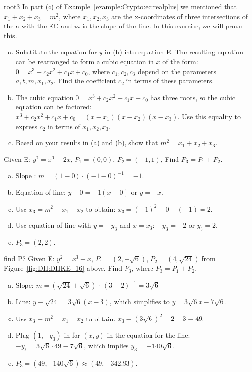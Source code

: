 \begin{exercise}{root3}
In part (c) of Example~\ref{example:Crypto:ec:realplus} we mentioned that $x_1+x_2+x_3=m^2$, where $x_1,x_2,x_3$ are the x-coordinates of three intersections of the a with the EC and $m$ is the slope of the line.  In this exercise, we will prove this.
\begin{enumerate}[(a)]
\item
Substitute the equation for $y$ in (b) into equation E. The resulting equation can be rearranged to form a cubic equation in $x$ of the form: $0 = x^3 + c_2 x^2 + c_1 x + c_0$, where $c_1, c_2, c_3$ depend on the parameters $a,b,m,x_1,x_2$. Find the coefficient $c_2$ in terms of these parameters.
\item
The cubic equation $0 = x^3 + c_2 x^2 + c_1 x + c_0$ has three roots, so the cubic equation can be factored:  $x^3 + c_2 x^2 + c_1 x + c_0 = (x-x_1)(x-x_2)(x-x_3)$. Use this equality to express $c_2$ in terms of $x_1, x_2, x_3$.
\item
Based on your results in (a) and (b), show that $m^2 = x_1 + x_2 + x_3$.
\end{enumerate}
\end{exercise}

\begin{example}{} 
Given E: $y^2 = x^3 - 2x$, $P_1 = (0,0)$, $P_2 = (-1,1)$, Find $P_3=P_1 + P_2$.
		
\begin{enumerate}[(a)]
\item
Slope :
$ m =(1 - 0) \cdot (-1- 0)^{-1}=-1$.
\item
Equation of line:	$y - 0 = -1(x- 0)$ or $y =-x $.
\item
Use $x_3 = m^2 - x_1 - x_2$ to obtain: $x_3 = (-1)^2 - 0 - (-1) = 2$.
\item
Use equation of line with $y=-y_3$ and $x=x_3$:  $-y_3 = -2$ or $y_3=2$.
\item
$P_3 = (2,2)$.
\end{enumerate}
\end{example}
\begin{example}{find P3} Given E: $y^2 = x^3 - x$, $P_1 = (2, -\sqrt{6})$, $P_2 = (4, \sqrt{24})$ from Figure~\ref{fig:DH:DHKE_16} above.
	Find $P_3$, where $P_3 = P_1 + P_2$.
\begin{enumerate}[(a)]
\item 
Slope: $m =( \sqrt{24}+\sqrt{6})$ $\cdot$ $(3-2)^{-1} = 3\sqrt{6}  $ \\
\item
Line: $y - \sqrt{24} = 3\sqrt{6}(x - 3)$, which simplifies to $y = 3\sqrt{6}x - 7\sqrt{6}$.
\item 
Use $x_3 = m^2 - x_1 - x_2$ to obtain: $x_3 = (3\sqrt{6})^2 - 2 - 3 = 49$.
\item
Plug $(1,-y_3)$ in for $(x,y)$ in the equation for the line: $-y_3 = 3\sqrt{6}\cdot 49 -7 \sqrt{6}$, which implies $y_3 = -140\sqrt{6}$. 
\item
$P_3 = (49,-140\sqrt{6}) \approx (49,-342.93)$.
\end {enumerate}  
\end{example}

